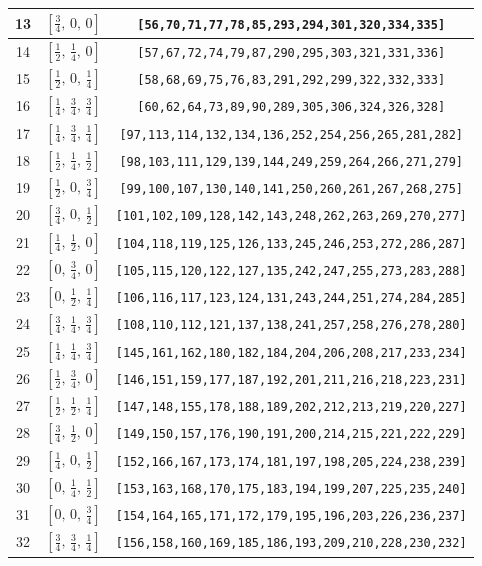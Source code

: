 \documentclass[fleqn,8pt]{jsarticle}
\begin{document}
\begin{longtable}{ccc}
13 & $\left[ \frac{3}{4},\, 0,\, 0 \right]$ & {\tt [56,70,71,77,78,85,293,294,301,320,334,335]} \\ \hline
14 & $\left[ \frac{1}{2},\, \frac{1}{4},\, 0 \right]$ & {\tt [57,67,72,74,79,87,290,295,303,321,331,336]} \\ \hline
15 & $\left[ \frac{1}{2},\, 0,\, \frac{1}{4} \right]$ & {\tt [58,68,69,75,76,83,291,292,299,322,332,333]} \\ \hline
16 & $\left[ \frac{1}{4},\, \frac{3}{4},\, \frac{3}{4} \right]$ & {\tt [60,62,64,73,89,90,289,305,306,324,326,328]} \\ \hline
17 & $\left[ \frac{1}{4},\, \frac{3}{4},\, \frac{1}{4} \right]$ & {\tt [97,113,114,132,134,136,252,254,256,265,281,282]} \\ \hline
18 & $\left[ \frac{1}{2},\, \frac{1}{4},\, \frac{1}{2} \right]$ & {\tt [98,103,111,129,139,144,249,259,264,266,271,279]} \\ \hline
19 & $\left[ \frac{1}{2},\, 0,\, \frac{3}{4} \right]$ & {\tt [99,100,107,130,140,141,250,260,261,267,268,275]} \\ \hline
20 & $\left[ \frac{3}{4},\, 0,\, \frac{1}{2} \right]$ & {\tt [101,102,109,128,142,143,248,262,263,269,270,277]} \\ \hline
21 & $\left[ \frac{1}{4},\, \frac{1}{2},\, 0 \right]$ & {\tt [104,118,119,125,126,133,245,246,253,272,286,287]} \\ \hline
22 & $\left[ 0,\, \frac{3}{4},\, 0 \right]$ & {\tt [105,115,120,122,127,135,242,247,255,273,283,288]} \\ \hline
23 & $\left[ 0,\, \frac{1}{2},\, \frac{1}{4} \right]$ & {\tt [106,116,117,123,124,131,243,244,251,274,284,285]} \\ \hline
24 & $\left[ \frac{3}{4},\, \frac{1}{4},\, \frac{3}{4} \right]$ & {\tt [108,110,112,121,137,138,241,257,258,276,278,280]} \\ \hline
25 & $\left[ \frac{1}{4},\, \frac{1}{4},\, \frac{3}{4} \right]$ & {\tt [145,161,162,180,182,184,204,206,208,217,233,234]} \\ \hline
26 & $\left[ \frac{1}{2},\, \frac{3}{4},\, 0 \right]$ & {\tt [146,151,159,177,187,192,201,211,216,218,223,231]} \\ \hline
27 & $\left[ \frac{1}{2},\, \frac{1}{2},\, \frac{1}{4} \right]$ & {\tt [147,148,155,178,188,189,202,212,213,219,220,227]} \\ \hline
28 & $\left[ \frac{3}{4},\, \frac{1}{2},\, 0 \right]$ & {\tt [149,150,157,176,190,191,200,214,215,221,222,229]} \\ \hline
29 & $\left[ \frac{1}{4},\, 0,\, \frac{1}{2} \right]$ & {\tt [152,166,167,173,174,181,197,198,205,224,238,239]} \\ \hline
30 & $\left[ 0,\, \frac{1}{4},\, \frac{1}{2} \right]$ & {\tt [153,163,168,170,175,183,194,199,207,225,235,240]} \\ \hline
31 & $\left[ 0,\, 0,\, \frac{3}{4} \right]$ & {\tt [154,164,165,171,172,179,195,196,203,226,236,237]} \\ \hline
32 & $\left[ \frac{3}{4},\, \frac{3}{4},\, \frac{1}{4} \right]$ & {\tt [156,158,160,169,185,186,193,209,210,228,230,232]} \\
\end{longtable}
\end{document}

